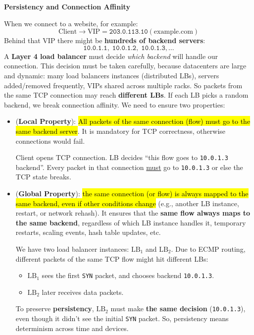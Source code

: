 \highspace
\begin{flushleft}
    \textcolor{Green3}{ \textbf{Persistency and Connection Affinity}}
\end{flushleft}
When we connect to a website, for example:
\begin{equation*}
    \text{Client} \rightarrow \text{VIP} = \texttt{203.0.113.10} (\text{example.com})
\end{equation*}
Behind that VIP there might be \textbf{hundreds of backend servers}:
\begin{equation*}
    \texttt{10.0.1.1}, \;\texttt{10.0.1.2}, \;\texttt{10.0.1.3}, \dots
\end{equation*}
A \textbf{Layer 4 load balancer} must decide \emph{which backend} will handle our connection. This decision must be taken carefully, because datacenters are large and dynamic: many load balancers instances (distributed LBs), servers added/removed frequently, VIPs shared across multiple racks. So packets from the same TCP connection may reach \textbf{different LBs}. If each LB picks a random backend, we break connection affinity. We need to ensure two properties:
\begin{itemize}
    \item {} (\textbf{Local Property}): \hl{All packets of the same connection (flow) must go to the same backend server}. It is mandatory for TCP correctness, otherwise connections would fail.

    \begin{examplebox}
        Client opens TCP connection. LB decides ``this flow goes to \texttt{10.0.1.3} backend''. Every packet in that connection \underline{must} go to \texttt{10.0.1.3} or else the TCP state breaks.
    \end{examplebox}


    \item {} (\textbf{Global Property}): \hl{the same connection (or flow) is always mapped to the same backend, even if other conditions change} (e.g., another LB instance, restart, or network rehash). It ensures that the \textbf{same flow always maps to the same backend}, regardless of which LB instance handles it, temporary restarts, scaling events, hash table updates, etc.

    \begin{examplebox}[: Persistency]
        We have two load balancer instances: $\text{LB}_1$ and $\text{LB}_2$. Due to ECMP routing, different packets of the same TCP flow might hit different LBs:
        \begin{itemize}
            \item $\text{LB}_{1}$ sees the first \texttt{SYN} packet, and chooses backend \texttt{10.0.1.3}.
            \item $\text{LB}_{2}$ later receives data packets.
        \end{itemize}
        To preserve \textbf{persistency}, $\text{LB}_{2}$ must make \textbf{the same decision} (\texttt{10.0.1.3}), even though it didn't see the initial \texttt{SYN} packet. So, persistency means determinism across time and devices.
    \end{examplebox}
\end{itemize}
